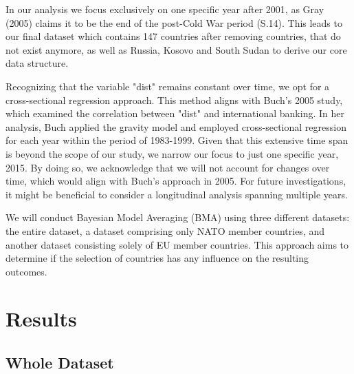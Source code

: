 \documentclass[12pt,a4paper]{article}
\begin{document}
In our analysis we focus exclusively on one specific year after 2001, as Gray (2005) claims it to be the end of the post-Cold War period (S.14). This leads to our final dataset which contains 147 countries after removing countries, that do not exist anymore, as well as Russia, Kosovo and South Sudan to derive our core data structure.

Recognizing that the variable "dist" remains constant over time, we opt for a cross-sectional regression approach. This method aligns with Buch's 2005 study, which examined the correlation between "dist" and international banking. In her analysis, Buch applied the gravity model and employed cross-sectional regression for each year within the period of 1983-1999. Given that this extensive time span is beyond the scope of our study, we narrow our focus to just one specific year, 2015. By doing so, we acknowledge that we will not account for changes over time, which would align with Buch's approach in 2005. For future investigations, it might be beneficial to consider a longitudinal analysis spanning multiple years. 

We will conduct Bayesian Model Averaging (BMA) using three different datasets: the entire dataset, a dataset comprising only NATO member countries, and another dataset consisting solely of EU member countries. This approach aims to determine if the selection of countries has any influence on the resulting outcomes. \\

 
\section{Results}
\subsection{Whole Dataset}
\end{document}
